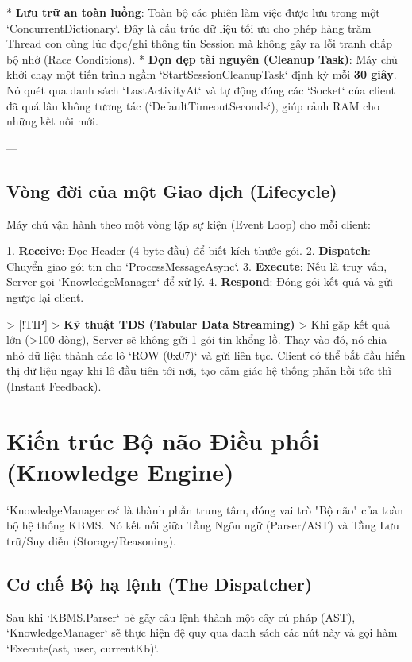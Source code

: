 *   \textbf{Lưu trữ an toàn luồng}: Toàn bộ các phiên làm việc được lưu trong một `ConcurrentDictionary`. Đây là cấu trúc dữ liệu tối ưu cho phép hàng trăm Thread con cùng lúc đọc/ghi thông tin Session mà không gây ra lỗi tranh chấp bộ nhớ (Race Conditions).
*   \textbf{Dọn dẹp tài nguyên (Cleanup Task)}: 
    Máy chủ khởi chạy một tiến trình ngầm `StartSessionCleanupTask` định kỳ mỗi \textbf{30 giây}. Nó quét qua danh sách `LastActivityAt` và tự động đóng các `Socket` của client đã quá lâu không tương tác (`DefaultTimeoutSeconds`), giúp rảnh RAM cho những kết nối mới.

---

\subsection{Vòng đời của một Giao dịch (Lifecycle)}

Máy chủ vận hành theo một vòng lặp sự kiện (Event Loop) cho mỗi client:

1.  \textbf{Receive}: Đọc Header (4 byte đầu) để biết kích thước gói.
2.  \textbf{Dispatch}: Chuyển giao gói tin cho `ProcessMessageAsync`.
3.  \textbf{Execute}: Nếu là truy vấn, Server gọi `KnowledgeManager` để xử lý.
4.  \textbf{Respond}: Đóng gói kết quả và gửi ngược lại client.

> [!TIP]
> \textbf{Kỹ thuật TDS (Tabular Data Streaming)}
> Khi gặp kết quả lớn (>100 dòng), Server sẽ không gửi 1 gói tin khổng lồ. Thay vào đó, nó chia nhỏ dữ liệu thành các lô `ROW (0x07)` và gửi liên tục. Client có thể bắt đầu hiển thị dữ liệu ngay khi lô đầu tiên tới nơi, tạo cảm giác hệ thống phản hồi tức thì (Instant Feedback).

\section{Kiến trúc Bộ não Điều phối (Knowledge Engine)}

`KnowledgeManager.cs` là thành phần trung tâm, đóng vai trò "Bộ não" của toàn bộ hệ thống KBMS. Nó kết nối giữa Tầng Ngôn ngữ (Parser/AST) và Tầng Lưu trữ/Suy diễn (Storage/Reasoning).

\subsection{Cơ chế Bộ hạ lệnh (The Dispatcher)}

Sau khi `KBMS.Parser` bẻ gãy câu lệnh thành một cây cú pháp (AST), `KnowledgeManager` sẽ thực hiện đệ quy qua danh sách các nút này và gọi hàm `Execute(ast, user, currentKb)`.

